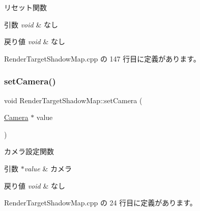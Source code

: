 リセット関数 


\begin{DoxyParams}{引数}
{\em void} & なし \\
\hline
\end{DoxyParams}

\begin{DoxyRetVals}{戻り値}
{\em void} & なし \\
\hline
\end{DoxyRetVals}


 Render\+Target\+Shadow\+Map.\+cpp の 147 行目に定義があります。

\mbox{\label{class_render_target_shadow_map_aaf7522ca239bc07bd78a6e431a28be09}} 
\subsubsection{\texorpdfstring{set\+Camera()}{setCamera()}}
{\footnotesize\ttfamily void Render\+Target\+Shadow\+Map\+::set\+Camera (\begin{DoxyParamCaption}\item[{\mbox{\hyperlink{class_camera}{Camera}} $\ast$}]{value }\end{DoxyParamCaption})}



カメラ設定関数 


\begin{DoxyParams}{引数}
{\em $\ast$value} & カメラ \\
\hline
\end{DoxyParams}

\begin{DoxyRetVals}{戻り値}
{\em void} & なし \\
\hline
\end{DoxyRetVals}


 Render\+Target\+Shadow\+Map.\+cpp の 24 行目に定義があります。

\mbox{\label{class_render_target_shadow_map_a684f715afcbec6138c71f2a6021b89d1}} 
